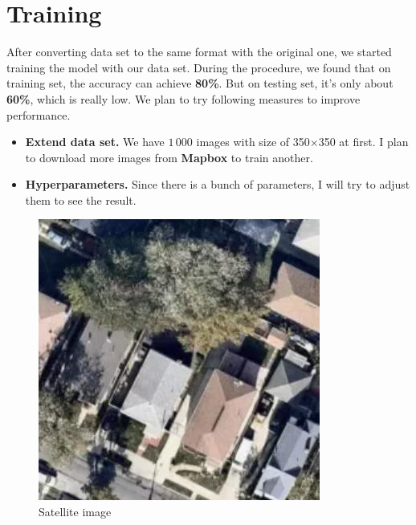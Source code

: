 \documentclass[journal，a4paper]{IEEEtran}
\begin{document}
\section{Training}
	After converting data set to the same format with the original one, we started training the model with our data set. During the procedure, we found that on training set, the accuracy can achieve \textbf{80\%}. But on testing set, it's only about \textbf{60\%}, which is really low. We plan to try following measures to improve performance.
	\begin{itemize}
		\item \textbf{Extend data set.} We have $1\,000$ images with size of 350$\times$350 at first. I plan to download more images from \textbf{Mapbox} to train another.
		\item \textbf{Hyperparameters.} Since there is a bunch of parameters, I will try to adjust them to see the result. 
	\end{itemize}

	\begin{figure}[!hbt]
		\begin{center}
		\includegraphics[width=\columnwidth]{SAT01-00000}
		\caption{Satellite image}
		\label{fig:sat}
		\end{center}
	\end{figure}
\end{document}
